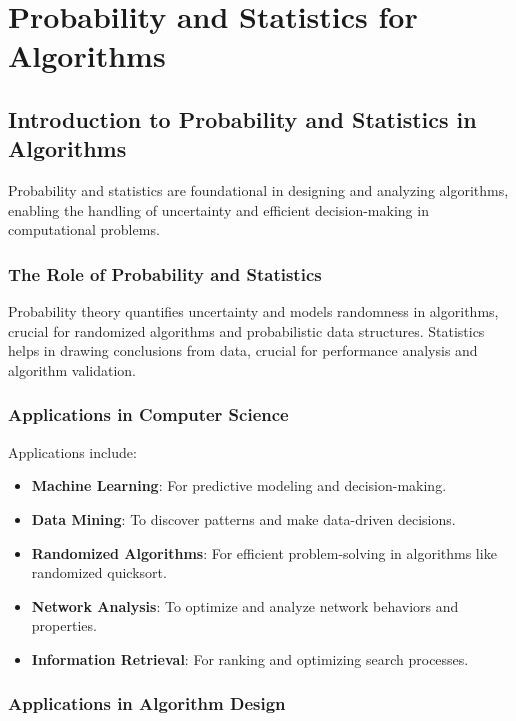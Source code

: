 \documentclass[12pt]{book} %
\begin{document}
\chapter{Probability and Statistics for Algorithms}

\section{Introduction to Probability and Statistics in Algorithms}

Probability and statistics are foundational in designing and analyzing algorithms, enabling the handling of uncertainty and efficient decision-making in computational problems.

\subsection{The Role of Probability and Statistics}

Probability theory quantifies uncertainty and models randomness in algorithms, crucial for randomized algorithms and probabilistic data structures. Statistics helps in drawing conclusions from data, crucial for performance analysis and algorithm validation.

\subsection{Applications in Computer Science}

Applications include:
\begin{itemize}
    \item \textbf{Machine Learning}: For predictive modeling and decision-making.
    \item \textbf{Data Mining}: To discover patterns and make data-driven decisions.
    \item \textbf{Randomized Algorithms}: For efficient problem-solving in algorithms like randomized quicksort.
    \item \textbf{Network Analysis}: To optimize and analyze network behaviors and properties.
    \item \textbf{Information Retrieval}: For ranking and optimizing search processes.
\end{itemize}

\subsection{Applications in Algorithm Design}
\end{document}

